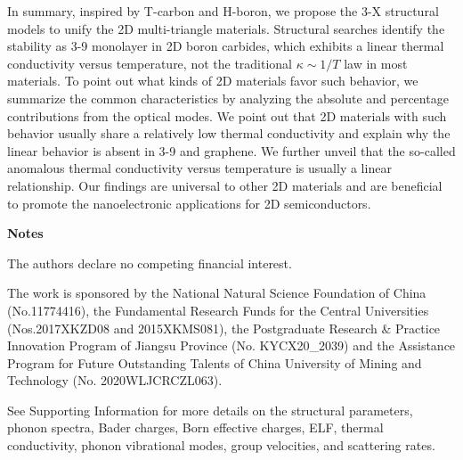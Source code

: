 \documentclass[journal=jpclcd,manuscript=article, layout=twocolumn]{achemso}
\begin{document}
	In summary, inspired by T-carbon and H-boron, we propose the 3-X structural models to unify the 2D multi-triangle materials. 
	Structural searches identify the stability as 3-9  monolayer in 2D boron carbides, which exhibits a linear thermal conductivity versus temperature, not the traditional $\kappa\sim1/T$ law in most materials. To point out what kinds of 2D materials favor such behavior, we summarize the common characteristics by analyzing the absolute and percentage contributions from the optical modes. We point out that 2D materials with such behavior usually share a relatively low thermal conductivity and explain why the linear behavior is absent in 3-9  and graphene. We further unveil that the so-called anomalous thermal conductivity versus temperature is usually a linear relationship. Our findings are universal to other 2D materials and are beneficial to promote the nanoelectronic applications for 2D semiconductors.
	
	
	\noindent\textbf{Notes}
	
	\noindent The authors declare no competing financial interest.

	
	

	\begin{acknowledgement}
	The work is sponsored by the National Natural Science Foundation of China (No.11774416), the Fundamental Research Funds for the Central Universities (Nos.2017XKZD08 and 2015XKMS081), the Postgraduate Research \& Practice Innovation Program of Jiangsu Province (No. KYCX20\_2039) and the Assistance Program for Future Outstanding Talents of China University of Mining and Technology (No. 2020WLJCRCZL063).
	\end{acknowledgement}

	\begin{suppinfo}
		See Supporting Information for more details on the structural parameters, phonon spectra, Bader charges, Born effective charges, ELF, thermal conductivity, phonon vibrational modes, group velocities, and scattering rates.
	\end{suppinfo}
	
	
 	
 	
\end{document}
